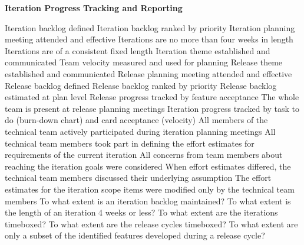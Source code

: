 \textbf{Iteration Progress Tracking and Reporting}
\begin{itemize}
	\taa Iteration backlog defined
	\taa Iteration backlog ranked by priority
	\taa Iteration planning meeting attended and effective
	\taa Iterations are no more than four weeks in length
	\taa Iterations are of a consistent fixed length
	\taar Iteration theme established and communicated %
	\taar Team velocity measured and used for planning
	\taar Release theme established and communicated 
	\taar Release planning meeting attended and effective 
	\taar Release backlog defined 
	\taar Release backlog ranked by priority 
	\taar Release backlog estimated at plan level 
	\taar Release progress tracked by feature acceptance
	\taar The whole team is present at release planning meetings
	\taar Iteration progress tracked by task to do (burn-down chart) and card acceptance (velocity)
	\pamr All members of the technical team actively participated during iteration planning meetings
	\pamr All technical team members took part in defining the effort estimates for 
requirements of the current iteration
	\pamr All concerns from team members about reaching the iteration goals were considered
	\pamr When effort estimates differed, the technical team members discussed their underlying assumption %
	\pamr The effort estimates for the iteration scope items were modified only by the  technical team members %
	\ops To what extent is an iteration backlog maintained?
	\ops To what extent is the length of an iteration 4 weeks or less?
	\ops To what extent are the iterations timeboxed?
	\ops To what extent are the release cycles timeboxed? 
	\ops To what extent are only a subset of the identified features developed during a release cycle? 
\end{itemize}

